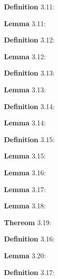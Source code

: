 \documentclass{article}
\begin{document}
\par 
\textbf{Definition} 3.11:
\newline

\par 
\textbf{Lemma} 3.11:
\newline

\par 
\textbf{Definition} 3.12:
\newline

\par 
\textbf{Lemma} 3.12:
\newline


\par 
\textbf{Definition} 3.13:
\newline

\par 
\textbf{Lemma} 3.13:
\newline


\par 
\textbf{Definition} 3.14:
\newline

\par 
\textbf{Lemma} 3.14:
\newline



\par 
\textbf{Definition} 3.15:
\newline

\par 
\textbf{Lemma} 3.15:
\newline


\par 
\textbf{Lemma} 3.16:
\newline

\par 
\textbf{Lemma} 3.17:
\newline

\par 
\textbf{Lemma} 3.18:
\newline

\par 
\textbf{Thereom} 3.19:
\newline


\par 
\textbf{Definition} 3.16:
\newline

\par 
\textbf{Lemma} 3.20:
\newline

\par 
\textbf{Definition} 3.17:
\newline
\end{document}
